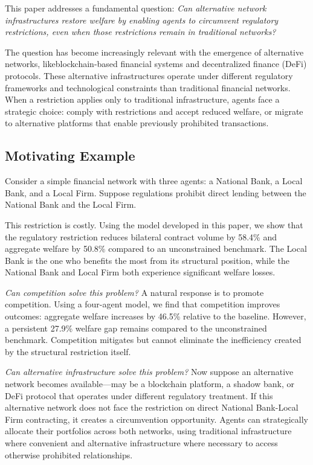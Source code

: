 \documentclass[12pt]{article}
\begin{document}
This paper addresses a fundamental question: \textit{Can alternative network infrastructures restore welfare by enabling agents to circumvent regulatory restrictions, even when those restrictions remain in traditional networks?}

The question has become increasingly relevant with the emergence of alternative networks, likeblockchain-based financial systems and decentralized finance (DeFi) protocols. These alternative infrastructures operate under different regulatory frameworks and technological constraints than traditional financial networks. When a restriction applies only to traditional infrastructure, agents face a strategic choice: comply with restrictions and accept reduced welfare, or migrate to alternative platforms that enable previously prohibited transactions.

\subsection{Motivating Example}


Consider a simple financial network with three agents: a National Bank, a Local Bank, and a Local Firm. Suppose regulations prohibit direct lending between the National Bank and the Local Firm. 

This restriction is costly. Using the model developed in this paper, we show that the regulatory restriction reduces bilateral contract volume by 58.4\% and aggregate welfare by 50.8\% compared to an unconstrained benchmark. The Local Bank is the one who benefits the most from its structural position, while the National Bank and Local Firm both experience significant welfare losses.

\textit{Can competition solve this problem?} A natural response is to promote competition. Using a four-agent model, we find that competition improves outcomes: aggregate welfare increases by 46.5\% relative to the baseline. However, a persistent 27.9\% welfare gap remains compared to the unconstrained benchmark. Competition mitigates but cannot eliminate the inefficiency created by the structural restriction itself.

\textit{Can alternative infrastructure solve this problem?} Now suppose an alternative network becomes available---may be a blockchain platform, a shadow bank, or DeFi protocol that operates under different regulatory treatment. If this alternative network does not face the restriction on direct National Bank-Local Firm contracting, it creates a circumvention opportunity. Agents can strategically allocate their portfolios across both networks, using traditional infrastructure where convenient and alternative infrastructure where necessary to access otherwise prohibited relationships.
\end{document}
